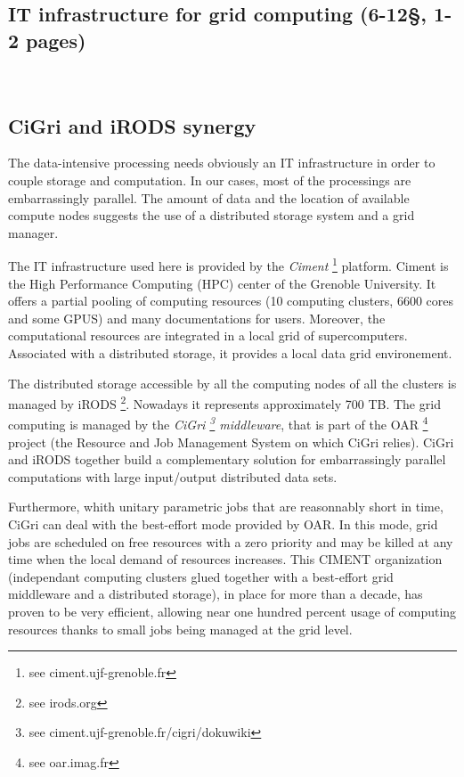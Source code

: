 \documentclass[a4paper, 10pt]{article}
\begin{document}
\newpage
\begin{multicols}{2}



\section{IT infrastructure for grid computing (6-12\S , 1-2 pages) }
~\\


\subsection{CiGri and iRODS synergy}

The data-intensive processing
needs obviously an IT infrastructure in order to couple storage and computation.
In our cases, most of the processings are embarrassingly parallel.
The amount of data and the location of available compute nodes suggests the use of a 
distributed storage system and a grid manager.


The IT infrastructure used here is provided by the \emph{Ciment} \footnote{see ciment.ujf-grenoble.fr} 
platform. Ciment is the High Performance Computing (HPC) center of the Grenoble University. It offers a partial pooling of computing 
resources (10 computing clusters, 6600 cores and some GPUS) and many documentations for users. 
Moreover, the computational resources are integrated in a local grid of supercomputers. Associated with a distributed storage,
it provides a local data grid environement.

The distributed storage accessible by all the computing nodes of all the clusters is managed by iRODS \footnote{see irods.org}.
Nowadays it represents approximately 700 TB. The grid computing is managed by the \emph{CiGri 
\footnote{see ciment.ujf-grenoble.fr/cigri/dokuwiki} middleware}, that is part of the OAR \footnote{see oar.imag.fr} project (the Resource and Job Management System on which CiGri relies). CiGri and iRODS together build a complementary solution for embarrassingly parallel computations with large input/output distributed data sets.

Furthermore, whith unitary parametric jobs that are reasonnably short in time, CiGri can deal with the best-effort mode provided by OAR. In this mode, grid jobs are scheduled on free resources with a zero priority and may be killed at any time when the local demand of resources increases. This CIMENT organization (independant computing clusters glued together with a best-effort grid middleware and a distributed storage), in place for more than a decade, has proven to be very efficient, allowing near one hundred percent usage of computing resources thanks to small jobs being managed at the grid level.


\end{multicols}
\end{document}
